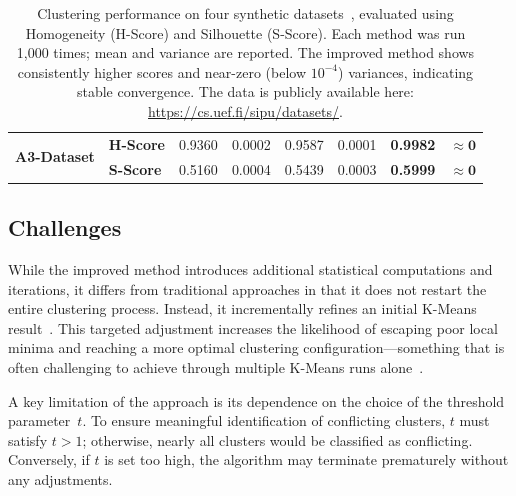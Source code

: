 \documentclass[10pt,twocolumn,letterpaper]{article}
\begin{document}
\begin{table}
\begin{tabular}{ll c c c c c c}
        \multirow{2}{*}{\textbf{A3-Dataset}} & \textbf{H-Score} & 0.9360                               & 0.0002                                 & 0.9587                                & 0.0001            & \textbf{0.9982} & $\mathbf{\approx 0}$ \\
                                             & \textbf{S-Score} & 0.5160                               & 0.0004                                 & 0.5439                                & 0.0003            & \textbf{0.5999} & $\mathbf{\approx 0}$ \\
        \bottomrule
    \end{tabular}
    \vspace{5pt}
    \caption{
        Clustering performance on four synthetic datasets~\cite{ClusteringDatasets}, evaluated using Homogeneity (H-Score) and Silhouette (S-Score). Each method was run 1,000 times; mean and variance are reported. The improved method shows consistently higher scores and near-zero (below $10^{-4}$) variances, indicating stable convergence. The data is publicly available here: \href{https://cs.uef.fi/sipu/datasets/}{https://cs.uef.fi/sipu/datasets/}.
    }
    \label{tab:clustering_comparison}
\end{table}


\subsection{Challenges}\label{subsec:challenges}

While the improved method introduces additional statistical computations and
iterations, it differs from traditional approaches in that it does not restart
the entire clustering process. Instead, it incrementally refines an initial
K-Means result~\cite{Abdullah10601123}. This targeted adjustment increases the
likelihood of escaping poor local minima and reaching a more optimal clustering
configuration—something that is often challenging to achieve through multiple
K-Means runs alone~\cite{FRANTI201995}.

A key limitation of the approach is its dependence on the choice of the
threshold parameter~$t$. To ensure meaningful identification of conflicting
clusters, $t$ must satisfy $t > 1$; otherwise, nearly all clusters would be
classified as conflicting. Conversely, if $t$ is set too high, the algorithm
may terminate prematurely without any adjustments.
\end{document}
